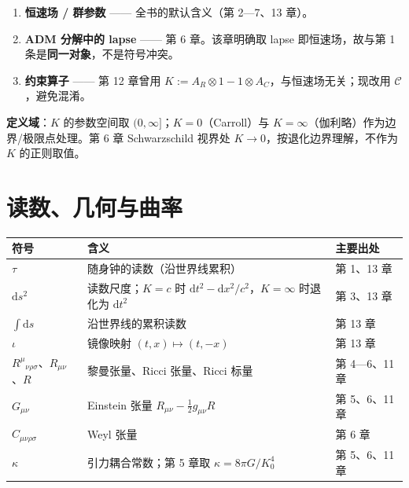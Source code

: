 \documentclass[
  chinese,
  a4paper,
  UTF8,
  12pt,
  oneside,
  openany]{ctexbook}
\newcounter{none} %
\providecommand{\tightlist}{%
  \setlength{\itemsep}{0pt}\setlength{\parskip}{0pt}}
\theoremstyle{plain}
\theoremstyle{plain}
\theoremstyle{plain}
\theoremstyle{definition}
\theoremstyle{plain}
\theoremstyle{plain}
\theoremstyle{remark}
\begin{document}
\begin{enumerate}
\def\labelenumi{\arabic{enumi}.}
\tightlist
\item
  \textbf{恒速场 / 群参数} ------ 全书的默认含义（第 2---7、13 章）。
\item
  \textbf{ADM 分解中的 lapse} ------ 第 6 章。该章明确取 lapse
  即恒速场，故与第 1 条是\textbf{同一对象}，不是符号冲突。
\item
  \textbf{约束算子} ------ 第 12 章曾用
  \(K:=A_{R}\otimes 1-1\otimes A_{C}\)，与恒速场无关；现改用
  \(\mathscr{C}\)，避免混淆。
\end{enumerate}

\textbf{定义域}：\(K\) 的参数空间取 \((0,\infty]\)；\(K=0\)（Carroll）与
\(K=\infty\)（伽利略）作为边界/极限点处理。第 6 章 Schwarzschild 视界处
\(K\to0\)，按退化边界理解，不作为 \(K\) 的正则取值。

\section*{读数、几何与曲率}\label{sec-notation-geometry}


{\def\LTcaptype{none} %
\begin{longtable}[]{@{}
  >{\raggedright\arraybackslash}p{}
  >{\raggedright\arraybackslash}p{}
  >{\raggedright\arraybackslash}p{}@{}}
\toprule\noalign{}
\begin{minipage}[b]{\linewidth}\raggedright
符号
\end{minipage} & \begin{minipage}[b]{\linewidth}\raggedright
含义
\end{minipage} & \begin{minipage}[b]{\linewidth}\raggedright
主要出处
\end{minipage} \\
\midrule\noalign{}
\endhead
\bottomrule\noalign{}
\endlastfoot
\(\tau\) & 随身钟的读数（沿世界线累积） & 第 1、13 章 \\
\(\mathrm{d}s^{2}\) & 读数尺度；\(K=c\) 时
\(\mathrm{d}t^{2}-\mathrm{d}x^{2}/c^{2}\)，\(K=\infty\) 时退化为
\(\mathrm{d}t^{2}\) & 第 3、13 章 \\
\(\int\mathrm{d}s\) & 沿世界线的累积读数 & 第 13 章 \\
\(\iota\) & 镜像映射 \((t,x)\mapsto(t,-x)\) & 第 13 章 \\
\(R^{\mu}{}_{\nu\rho\sigma}\)、\(R_{\mu\nu}\)、\(R\) & 黎曼张量、Ricci
张量、Ricci 标量 & 第 4---6、11 章 \\
\(G_{\mu\nu}\) & Einstein 张量 \(R_{\mu\nu}-\tfrac12 g_{\mu\nu}R\) & 第
5、6、11 章 \\
\(C_{\mu\nu\rho\sigma}\) & Weyl 张量 & 第 6 章 \\
\(\kappa\) & 引力耦合常数；第 5 章取 \(\kappa=8\pi G/K_{0}^{4}\) & 第
5、6、11 章 \\
\end{longtable}
}
\end{document}
